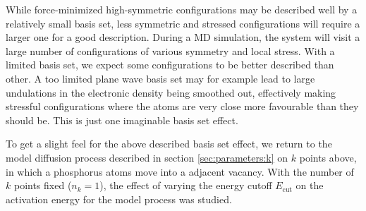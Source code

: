 \documentclass[11pt,bibliography=totoc,index=totoc]{scrbook}   %
\begin{document}
While force-minimized high-symmetric configurations may be described well by a relatively small basis set,
less symmetric and stressed configurations will require a larger one for a good description. 
During a MD simulation, the system will visit a large number of configurations of various symmetry and local stress.
With a limited basis set, we expect some configurations to be better described than other. 
A too limited plane wave basis set may for example lead to large undulations in the electronic density being smoothed out, 
effectively making stressful configurations where the atoms are very close more favourable than they should be. 
This is just one imaginable basis set effect.

To get a slight feel for the above described basis set effect, we return to the model diffusion process described in section \ref{sec:parameters:k} on $k$ points above, in which a phosphorus atoms move into a adjacent vacancy. 
With the number of $k$ points fixed ($n_k=1$), the effect of varying the energy cutoff $E_{\text{cut}}$ on the activation energy for the model process was studied. 


\end{document}
